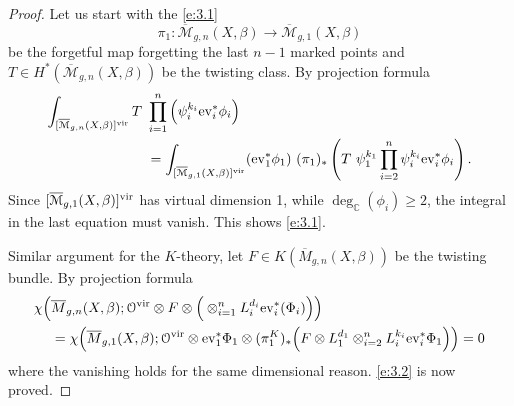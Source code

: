 \documentclass[11pt]{amsart}
\newtheorem*{main theorem*}{Main Theorem}
\theoremstyle{remark}
\numberwithin{equation}{section}
\newcommand{\M}{\overline{\mathcal{M}}}
\newcommand{\vir}{{\rm vir}}
\newcommand{\ev}{{\rm ev}}
\newcommand{\ch}{{\rm ch}}
\newcommand{\Coeff}{{\rm Coeff}}
\newcommand{\leg}{{\rm leg}}
\newcommand{\arm}{{\rm arm}}
\newcommand{\tail}{{\rm tail}}
\begin{document}
\begin{proof}
Let us start with the \eqref{e:3.1}
\[
 \pi_1 : \M_{g,n}(X, \beta) \to \M_{g,1} (X, \beta)
\]
be the forgetful map forgetting the last $n-1$ marked points and $T\in H^*(\M_{g,n}(X,\beta))$ be the twisting class.
By projection formula
\[
\begin{split}
\int_{[\M_{g,n}(X, \beta)]^{\vir}} T \ &\prod_{i=1}^{n} \Big(\psi_i^{k_i} \ev_i^*\phi_i\Big) 
\\
&= \int_{[\M_{g,1}(X, \beta)]^{\vir}} (\ev_1^* \phi_1 ) \ (\pi_1)_*\left( T \ \psi_1^{k_1}\prod_{i=2}^{n} \psi_i^{k_i} \ev_i^*\phi_i \right) .
\end{split}
\] 
Since $[\M_{g,1}(X,\beta)]^{\vir}$ has virtual dimension 1, while $\deg_{\mathbb{C}}(\phi_i) \geq 2$, the integral in the last equation must vanish. This shows \eqref{e:3.1}.

Similar argument for the $K$-theory, let $F\in K(\overline{M}_{g,n}(X,\beta))$ be the twisting bundle. By projection formula
\[
\begin{split}
    \chi \Big( &\overline{M}_{g,n}(X,\beta) ; \mathcal{O}^{\vir}\otimes F \otimes\Big( \otimes_{i=1}^n L_i^{d_i}\ev_i^*(\Phi_i)  \Big)\Big)
    \\
    & = \chi \Big( \overline{M}_{g,1}(X,\beta); \mathcal{O}^{\vir} \otimes \ev_1^* \Phi_1 \otimes(\pi_1^K)_*\Big(F \otimes L_1^{d_1}\otimes_{i=2}^n L_i^{k_i} \ev_i^* \Phi_1 \Big) \Big)
    =0
\end{split}
\]
where the vanishing holds for the same dimensional reason. \eqref{e:3.2} is now proved.




\end{proof}
\end{document}

